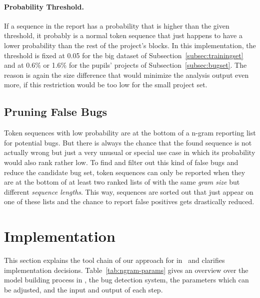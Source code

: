 \paragraph{Probability Threshold.}
If a sequence in the report has a probability that is higher than the given threshold, it probably is a normal token sequence that just happens to have a lower probability than the rest of the project's blocks. In this implementation, the threshold is fixed at 0.05 for the big dataset of Subsection~\ref{subsec:trainingset} and at 0.6\% or 1.6\% for the pupils' projects of Subsection~\ref{subsec:bugset}. The reason is again the size difference that would minimize the analysis output even more, if this restriction would be too low for the small project set.

\subsection{Pruning False Bugs}\label{subsec:false_bugs}
Token sequences with low probability are at the bottom of a n-gram reporting list for potential bugs. But there is always the chance that the found sequence is not actually wrong but just a very unusual or special use case in which its probability would also rank rather low. To find and filter out this kind of false bugs and reduce the candidate bug set, token sequences can only be reported when they are at the bottom of at least two ranked lists of  with the same \textit{gram size} but different \textit{sequence lengths}. This way, sequences are sorted out that just appear on one of these lists and the chance to report false positives gets drastically reduced. 


\section{Implementation}\label{sec:implementation}
This section explains the tool chain of our approach for \ngram{} in \scratch\ and clarifies implementation
decisions. Table~\ref{tab:ngram-params} gives an overview over the model building process in \scratch, the bug detection system, the parameters which can be adjusted, and the input and output of each step.

